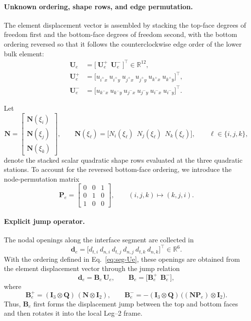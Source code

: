 \documentclass[smallextended]{svjour3}       %
\newcommand{\vb}[1]{\bm{#1}}      %
\newcommand{\mat}[1]{\mathbf{#1}}  %
\newcommand{\QQ}{\mat{Q}}          %
\providecommand{\bd}{\vb d}
\renewcommand{\bd}{\vb d}
\begin{document}
\paragraph{Unknown ordering, shape rows, and edge permutation.}
The element displacement vector is assembled by stacking the top-face degrees
of freedom first and the bottom-face degrees of freedom second, with the
bottom ordering reversed so that it follows the counterclockwise edge order
of the lower bulk element:
\begin{align}
	\vb U_e&=
	\big[\ \vb U_e^{+}\ \ \vb U_e^{-}\ \big]^\top
	\in\mathbb{R}^{12},
	\label{eq:seg-Ue}
	\\
	\vb U_e^{+}&=
	\big[
	u_{i^+x}\ u_{i^+y}\ 
	u_{j^+x}\ u_{j^+y}\ 
	u_{k^+x}\ u_{k^+y}
	\big]^\top,
	\nonumber\\
	\vb U_e^{-}&=
	\big[
	u_{k^-x}\ u_{k^-y}\ 
	u_{j^-x}\ u_{j^-y}\ 
	u_{i^-x}\ u_{i^-y}
	\big]^\top.
	\nonumber
\end{align}

Let
\[
\mat N=
\begin{bmatrix}
	\bm N(\xi_i)\\
	\bm N(\xi_j)\\
	\bm N(\xi_k)
\end{bmatrix},
\qquad
\bm N(\xi_\ell)=
\big[
N_i(\xi_\ell)\ \ N_j(\xi_\ell)\ \ N_k(\xi_\ell)
\big],
\qquad
\ell\in\{i,j,k\},
\]
denote the stacked scalar quadratic shape rows evaluated at the three
quadratic stations. To account for the reversed bottom-face ordering, we
introduce the node-permutation matrix
\begin{equation}
	\mat P_e=
	\begin{bmatrix}
		0&0&1\\
		0&1&0\\
		1&0&0
	\end{bmatrix},
	\qquad
	(i,j,k)\mapsto(k,j,i).
	\label{eq:seg-Pi}
\end{equation}

\paragraph{Explicit jump operator.}
The nodal openings along the interface segment are collected in
\[
\bd_e=
\big[
d_{t,i}\ d_{n,i}\ 
d_{t,j}\ d_{n,j}\ 
d_{t,k}\ d_{n,k}
\big]^\top
\in\mathbb{R}^6.
\]
With the ordering defined in Eq.~\eqref{eq:seg-Ue}, these openings are
obtained from the element displacement vector through the jump relation
\begin{equation}
	\bd_e=\mat B_e\,\vb U_e,
	\qquad
	\mat B_e=
	\big[
	\mat B_e^{+}\ \ \mat B_e^{-}
	\big],
	\label{eq:seg-Be}
\end{equation}
where
\begin{equation}
	\mat B_e^{+}
	=
	(\mat I_3\otimes\QQ)\,(\mat N\otimes\mat I_2),
	\qquad
	\mat B_e^{-}
	=
	-(\mat I_3\otimes\QQ)\,\big((\mat N\mat P_e)\otimes\mat I_2\big).
	\label{eq:seg-Be-pm}
\end{equation}
Thus, \(\mat B_e\) first forms the displacement jump between the top and
bottom faces and then rotates it into the local Leg--2 frame.
\end{document}
